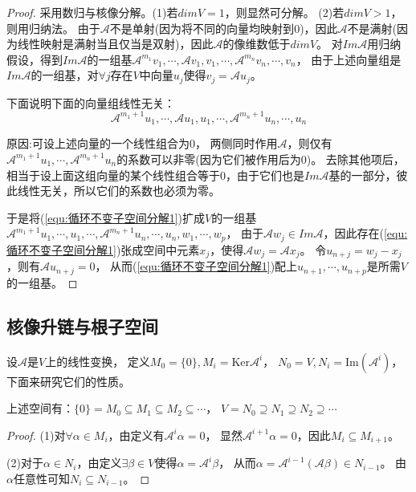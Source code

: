 \begin{proof}
  采用数归与核像分解。(1)若$dim V = 1$，则显然可分解。
  (2)若$dim V > 1$，则用归纳法。
  由于$\mathcal{A}$不是单射(因为将不同的向量均映射到$0$)，因此$\mathcal{A}$不是满射(因为线性映射是满射当且仅当是双射)，因此$\mathcal{A}$的像维数低于$dim V$。
  对$Im \mathcal{A}$用归纳假设，得到$Im \mathcal{A}$的一组基$\mathcal{A}^{m_1} v_1,\cdots, \mathcal{A}v_1,v_1, \cdots, \mathcal{A}^{m_n}v_n,\cdots,v_n$，
  由于上述向量组是$Im \mathcal{A}$的一组基，对$\forall j$存在$V$中向量$u_j$使得$v_j = \mathcal{A}u_j$。

  下面说明下面的向量组线性无关：
  \begin{equation} \label{equ:循环不变子空间分解1}
    \mathcal{A}^{m_1 + 1}u_1, \cdots, \mathcal{A}u_1,u_1,\cdots, \mathcal{A}^{m_n+1}u_n ,\cdots,u_n
  \end{equation}

  原因:可设上述向量的一个线性组合为$0$，
  两侧同时作用$\mathcal{A}$，则仅有$\mathcal{A}^{m_1+1}u_1, \cdots, \mathcal{A}^{m_n + 1}u_n$的系数可以非零(因为它们被作用后为0)。
  去除其他项后，相当于设上面这组向量的某个线性组合等于$0$，由于它们也是$Im \mathcal{A}$基的一部分，彼此线性无关，所以它们的系数也必须为零。

  于是将(\ref{equ:循环不变子空间分解1})扩成$V$的一组基$\mathcal{A}^{m_1 + 1}u_1,\cdots,u_1,\cdots, \mathcal{A}^{m_n+1}u_n ,\cdots, u_n, w_1, \cdots, w_p$，
  由于$\mathcal{A} w_j \in Im \mathcal{A}$，因此存在(\ref{equ:循环不变子空间分解1})张成空间中元素$x_j$，使得$\mathcal{A} w_j = \mathcal{A} x_j$。
  令$u_{n+j} = w_j - x_j$，则有$\mathcal{A} u_{n+j} = 0$，
  从而(\ref{equ:循环不变子空间分解1})配上$u_{n+1},\cdots,u_{n+p}$是所需$V$的一组基。
\end{proof}

\subsection{核像升链与根子空间}

设$\mathcal{A}$是$V$上的线性变换，
定义$M_0 = \{0\}, M_i = \text{Ker} \mathcal{A}^i$，
$N_0 = V, N_i = \text{Im}( \mathcal{A}^i)$，
下面来研究它们的性质。

\begin{lemma}[核像空间升链] \label{lemma:M和N的包含关系}
  上述空间有：$\{0\} = M_0 \subseteq M_1 \subseteq M_2 \subseteq \cdots$，
  $V = N_0 \supseteq N_1 \supseteq N_2 \supseteq \cdots$
\end{lemma}

\begin{proof}
  (1)对$\forall \alpha \in M_i$，由定义有$\mathcal{A}^i\alpha = 0$，
  显然$\mathcal{A}^{i+1}\alpha =0$，因此$M_i \subseteq M_{i+1}$。

  (2)对于$\alpha \in N_i$，由定义$\exists \beta \in V$使得$\alpha = \mathcal{A}^i \beta$，
  从而$\alpha = \mathcal{A}^{i-1}( \mathcal{A} \beta) \in N_{i-1}$。
  由$\alpha$任意性可知$N_i \subseteq N_{i-1}$。
\end{proof}

